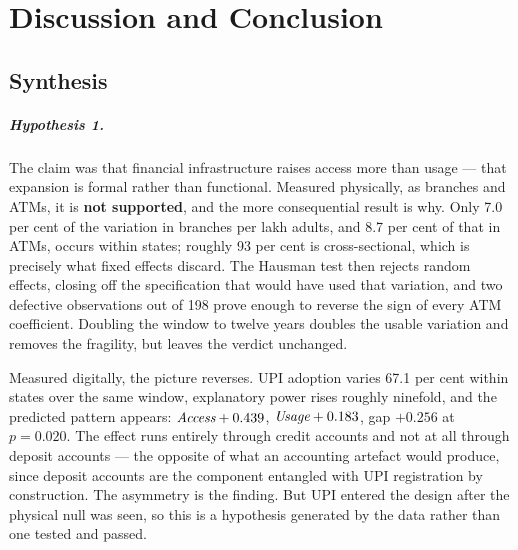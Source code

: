 \chapter{Discussion and Conclusion}
\label{ch:conclusion}

\section{Synthesis}
\label{sec:synth}

\paragraph{Hypothesis 1.} The claim was that financial infrastructure raises access more than usage
--- that expansion is formal rather than functional. Measured physically, as branches and ATMs, it
is \textbf{not supported}, and the more consequential result is why. Only 7.0 per cent of the
variation in branches per lakh adults, and 8.7 per cent of that in ATMs, occurs within states;
roughly 93 per cent is cross-sectional, which is precisely what fixed effects discard. The Hausman
test then rejects random effects, closing off the specification that would have used that
variation, and two defective observations out of 198 prove enough to reverse the sign of every ATM
coefficient. Doubling the window to twelve years doubles the usable variation and removes the
fragility, but leaves the verdict unchanged.

Measured digitally, the picture reverses. UPI adoption varies 67.1 per cent within states over the
same window, explanatory power rises roughly ninefold, and the predicted pattern appears:
$\textit{Access}{} +0.439$, $\textit{Usage}{} +0.183$, gap $+0.256$ at $p = 0.020$. The effect runs entirely
through credit accounts and not at all through deposit accounts --- the opposite of what an
accounting artefact would produce, since deposit accounts are the component entangled with UPI
registration by construction. The asymmetry is the finding. But UPI entered the design after the
physical null was seen, so this is a hypothesis generated by the data rather than one tested and
passed.


